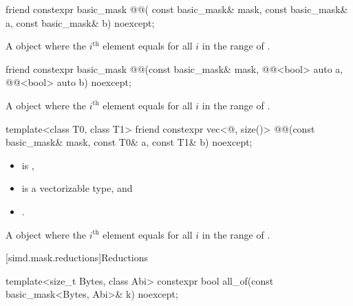 \begin{itemdecl}
friend constexpr basic_mask @@(
  const basic_mask& mask, const basic_mask& a, const basic_mask& b) noexcept;
\end{itemdecl}

\begin{itemdescr}
\pnum
\returns
A  object where the $i^\text{th}$ element equals
 for all $i$ in the range of
.
\end{itemdescr}

\begin{itemdecl}
friend constexpr basic_mask
@@(const basic_mask& mask, @@<bool> auto a, @@<bool> auto b) noexcept;
\end{itemdecl}

\begin{itemdescr}
\pnum
\returns
A  object where the $i^\text{th}$ element equals
 for all $i$ in the range of .
\end{itemdescr}

\begin{itemdecl}
template<class T0, class T1>
  friend constexpr vec<@\seebelow@, size()>
    @@(const basic_mask& mask, const T0& a, const T1& b) noexcept;
\end{itemdecl}

\begin{itemdescr}
\pnum
\constraints
\begin{itemize}
 \item
    is ,
 \item
    is a vectorizable type, and
 \item
   .
\end{itemize}

\pnum
\returns
A  object where the $i^\text{th}$ element equals
 for all $i$ in the range of .
\end{itemdescr}

[simd.mask.reductions]{Reductions}

\begin{itemdecl}
template<size_t Bytes, class Abi>
  constexpr bool all_of(const basic_mask<Bytes, Abi>& k) noexcept;
\end{itemdecl}

